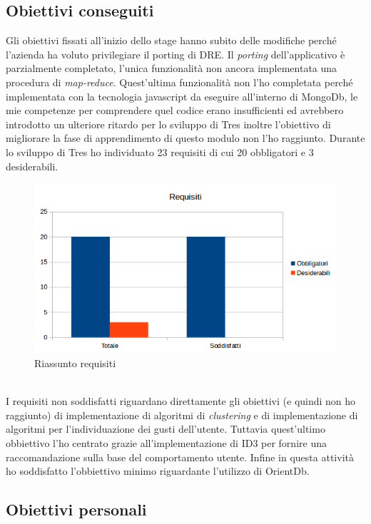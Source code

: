 \subsection{Obiettivi conseguiti}
Gli obiettivi fissati all'inizio dello stage hanno subito delle modifiche perché l'azienda ha voluto privilegiare il porting di DRE. Il \emph{porting} dell'applicativo è parzialmente completato, l'unica funzionalità non ancora implementata una procedura di \emph{map-reduce}. Quest'ultima funzionalità non l'ho completata perché implementata con la tecnologia javascript da eseguire all'interno di MongoDb, le mie competenze per comprendere quel codice erano insufficienti ed avrebbero introdotto un ulteriore ritardo per lo sviluppo di Tres inoltre l'obiettivo di migliorare la fase di apprendimento di questo modulo non l'ho raggiunto. Durante lo sviluppo di Tres ho individuato 23 requisiti di cui 20 obbligatori e 3 desiderabili.  
\begin{figure}[h]
\centering
\includegraphics[scale=0.62]{immagini/graficorequisiti}
\caption{Riassunto requisiti}
\label{fig:client-server}
\end{figure}
\\I requisiti non soddisfatti riguardano direttamente gli obiettivi (e quindi non ho raggiunto) di implementazione di algoritmi di \emph{clustering} e di implementazione di algoritmi per l'individuazione dei gusti dell'utente. Tuttavia quest'ultimo obbiettivo l'ho centrato grazie all'implementazione di ID3 per fornire una raccomandazione sulla base del comportamento utente. Infine in questa attività ho soddisfatto l'obbiettivo minimo riguardante l'utilizzo di OrientDb.

\subsection{Obiettivi personali}




